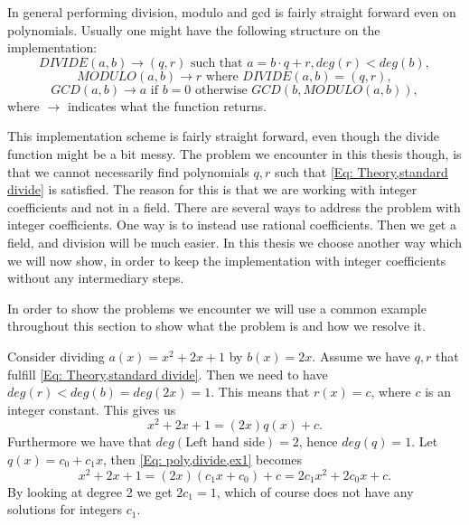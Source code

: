 In general performing division, modulo and gcd is fairly straight forward even on polynomials. Usually one might have the following structure on the implementation:
\begin{equation}\label{Eq: Theory,standard divide}
  DIVIDE(a,b) \rightarrow (q,r) \text{ such that } a=b\cdot q + r, deg(r) < deg(b),
\end{equation}
\begin{equation}
  MODULO(a,b) \rightarrow r \text{ where } DIVIDE(a,b) = (q,r),
\end{equation}
\begin{equation}\label{Eq: Theory,standard gcd}
  GCD(a,b) \rightarrow a \text{ if } b=0 \text{ otherwise } GCD(b,MODULO(a,b)),
\end{equation}
where $\rightarrow$ indicates what the function returns.

This implementation scheme is fairly straight forward, even though the divide function might be a bit messy. The problem we encounter in this thesis though, is that we cannot necessarily find polynomials $q,r$ such that \eqref{Eq: Theory,standard divide} is satisfied. The reason for this is that we are working with integer coefficients and not in a field. There are several ways to address the problem with integer coefficients. One way is to instead use rational coefficients. Then we get a field, and division will be much easier. In this thesis we choose another way which we will now show, in order to keep the implementation with integer coefficients without any intermediary steps.

In order to show the problems we encounter we will use a common example throughout this section to show what the problem is and how we resolve it.
\begin{example}
  Consider dividing $a(x)=x^2+2x+1$ by $b(x)=2x$. Assume we have $q,r$ that fulfill \eqref{Eq: Theory,standard divide}. Then we need to have $deg(r)<deg(b)=deg(2x)=1$. This means that $r(x)=c$, where $c$ is an integer constant. This gives us
  \begin{equation}\label{Eq: poly,divide,ex1}
    x^2+2x+1=(2x)q(x)+c.
  \end{equation}
  Furthermore we have that $deg(\text{Left hand side})=2$, hence $deg(q)=1$. Let $q(x)=c_0+c_1x$, then \eqref{Eq: poly,divide,ex1} becomes
  \begin{equation}
    x^2+2x+1=(2x)(c_1x+c_0)+c=2c_1x^2+2c_0x+c.
  \end{equation}
  By looking at degree 2 we get $2c_1=1$, which of course does not have any solutions for integers $c_1$.
\end{example}


